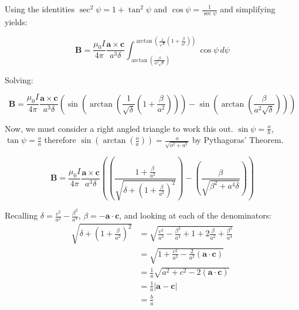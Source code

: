 Using the identities $\sec^2 \psi = 1 + \tan^2 \psi$ and $\cos \psi = \frac{1}{\sec \psi}$ and simplifying yields:

\begin{equation*}
  \mathbf{B} = \frac{\mu_0 I}{4\pi} \frac{\mathbf{a} \times \mathbf{c}}{a^3\delta} \int_{\arctan\left (\frac{\beta}{a^2\sqrt{\delta}}\right)}^{\arctan\left(\frac{1}{\sqrt{\delta}}\left(1+\frac{\beta}{a^2}\right)\right)} \cos\psi \, d\psi
\end{equation*}

Solving:

\begin{equation*}
  \mathbf{B} = \frac{\mu_0 I}{4\pi} \frac{\mathbf{a} \times \mathbf{c}}{a^3\delta} \left ( \sin\left( \arctan\left(\frac{1}{\sqrt{\delta}}\left(1+\frac{\beta}{a^2}\right)\right)\right) - \sin \left( \arctan\left (\frac{\beta}{a^2\sqrt{\delta}}\right) \right) \right )
\end{equation*}

Now, we must consider a right angled triangle to work this out. $\sin\psi = \frac{o}{h}$, $\tan\psi = \frac{o}{a}$ therefore $\sin\left( \arctan \left( \frac{o}{a} \right) \right) = \frac{o}{\sqrt{o^2 + a^2}}$ by Pythagoras' Theorem.

\begin{equation*}
  \mathbf{B} = \frac{\mu_0 I}{4\pi} \frac{\mathbf{a} \times \mathbf{c}}{a^3\delta} \left( \left( \frac{1 + \frac{\beta}{a^2}}{\sqrt{\delta + \left( 1 + \frac{\beta}{a^2} \right)^2}} \right) - \left( \frac{\beta}{\sqrt{\beta^2 + a^4 \delta}} \right)  \right) 
\end{equation*}

Recalling $\delta = \frac{c^2}{a^2} - \frac{\beta^2}{a^4}$, $\beta = -\mathbf{a} \cdot \mathbf{c}$, and looking at each of the denominators:
\begin{align*}
  \sqrt{\delta + \left( 1 + \frac{\beta}{a^2} \right)^2} &= \sqrt{\frac{c^2}{a^2} - \frac{\beta^2}{a^4} + 1 + 2\frac{\beta}{a^2} + \frac{\beta^2}{a^4}} \\
                             &= \sqrt{1 + \frac{c^2}{a^2} - \frac{2}{a^2} \left(\mathbf{a} \cdot \mathbf{c} \right)} \\
                             &= \frac{1}{a} \sqrt{a^2 + c^2 - 2\left(\mathbf{a} \cdot \mathbf{c}\right)} \\
                             &= \frac{1}{a} \left \vert \mathbf{a} - \mathbf{c} \right \vert \\
                             &= \frac{b}{a}
\end{align*}


